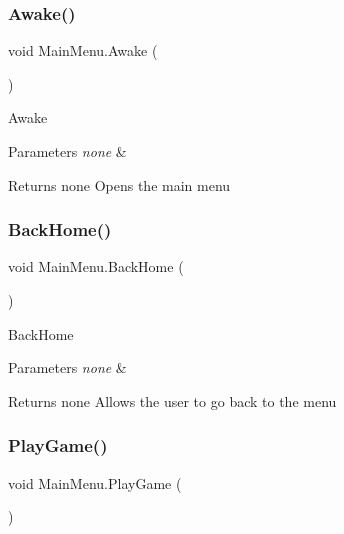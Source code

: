 \subsubsection{\texorpdfstring{Awake()}{Awake()}}
{\footnotesize\ttfamily void Main\+Menu.\+Awake (\begin{DoxyParamCaption}{ }\end{DoxyParamCaption})\hspace{0.3cm}{\ttfamily [inline]}}

Awake 
\begin{DoxyParams}{Parameters}
{\em none} & \\
\hline
\end{DoxyParams}
\begin{DoxyReturn}{Returns}
none Opens the main menu 
\end{DoxyReturn}
\mbox{\label{class_main_menu_ac08c5e57bb188cc5612d644e676245e0}} 
\subsubsection{\texorpdfstring{Back\+Home()}{BackHome()}}
{\footnotesize\ttfamily void Main\+Menu.\+Back\+Home (\begin{DoxyParamCaption}{ }\end{DoxyParamCaption})\hspace{0.3cm}{\ttfamily [inline]}}

Back\+Home 
\begin{DoxyParams}{Parameters}
{\em none} & \\
\hline
\end{DoxyParams}
\begin{DoxyReturn}{Returns}
none Allows the user to go back to the menu 
\end{DoxyReturn}
\mbox{\label{class_main_menu_a11d7e3cd6b90cf59659e03e830e02db5}} 
\subsubsection{\texorpdfstring{Play\+Game()}{PlayGame()}}
{\footnotesize\ttfamily void Main\+Menu.\+Play\+Game (\begin{DoxyParamCaption}{ }\end{DoxyParamCaption})\hspace{0.3cm}{\ttfamily [inline]}}

